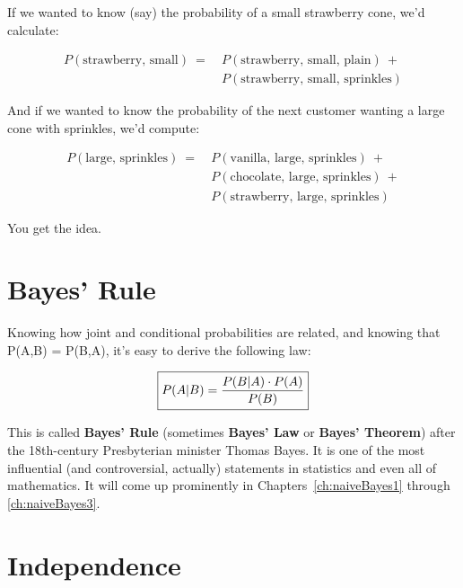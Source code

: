 If we wanted to know (say) the probability of a small strawberry cone, we'd
calculate:

\vspace{-.2in}
\begin{align*}
P(\textrm{strawberry, small})\ =\ & P(\textrm{strawberry, small, plain})\ +\\ 
&P(\textrm{strawberry, small, sprinkles})
\end{align*}
\vspace{-.2in}

And if we wanted to know the probability of the next customer wanting a large
cone with sprinkles, we'd compute:

\vspace{-.2in}
\begin{align*}
P(\textrm{large, sprinkles})\ =\ & P(\textrm{vanilla, large, sprinkles})\ + \\
& P(\textrm{chocolate, large, sprinkles})\ + \\
& P(\textrm{strawberry, large, sprinkles})
\end{align*}
\vspace{-.2in}

You get the idea.


\section{Bayes' Rule}
\label{sec:bayes}

Knowing how joint and conditional probabilities are related, and knowing that
P(A,B) = P(B,A), it's easy to derive the following law:

\vspace{-.2in}
\begin{align*}
\framebox{$P(A|B) = \dfrac{P(B|A) \cdot P(A)}{P(B)}$}
\end{align*}


This is called \textbf{Bayes' Rule} (sometimes \textbf{Bayes' Law} or
\textbf{Bayes' Theorem}) after the 18th-century Presbyterian minister Thomas
Bayes. It is one of the most influential (and controversial, actually)
statements in statistics and even all of mathematics. It will come up
prominently in Chapters~\ref{ch:naiveBayes1} through \ref{ch:naiveBayes3}.


\section{Independence}


